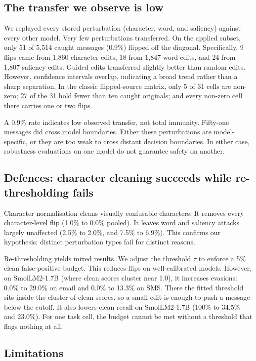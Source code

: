 \subsection{The transfer we observe is low}

We replayed every stored perturbation (character, word, and saliency) against
every other model. Very few perturbations transferred. On the applied subset,
only 51 of 5{,}514 caught messages (0.9\%) flipped off the diagonal.
Specifically, 9 flips came from 1{,}860 character edits, 18 from 1{,}847 word
edits, and 24 from 1{,}807 saliency edits. Guided edits transferred slightly
better than random edits. However, confidence intervals overlap, indicating a
broad trend rather than a sharp separation. In the classic flipped-source
matrix, only 5 of 31 cells are non-zero; 27 of the 31 hold fewer than ten caught
originals; and every non-zero cell there carries one or two flips.

A 0.9\% rate indicates low observed transfer, not total immunity. Fifty-one
messages did cross model boundaries. Either these perturbations are
model-specific, or they are too weak to cross distant decision boundaries. In
either case, robustness evaluations on one model do not guarantee safety on
another.

\subsection{Defences: character cleaning succeeds while re-thresholding fails}

Character normalisation cleans visually confusable characters. It removes every
character-level flip (1.0\% to 0.0\% pooled). It leaves word and saliency
attacks largely unaffected (2.5\% to 2.0\%, and 7.5\% to 6.9\%). This confirms
our hypothesis: distinct perturbation types fail for distinct reasons.

Re-thresholding yields mixed results. We adjust the threshold $\tau$ to enforce a
5\% clean false-positive budget. This reduces flips on well-calibrated models.
However, on SmolLM2-1.7B (where clean scores cluster near 1.0), it increases
evasions: 0.0\% to 29.0\% on email and 0.0\% to 13.3\% on SMS. There the fitted
threshold sits inside the cluster of clean scores, so a small edit is enough to
push a message below the cutoff. It also lowers clean recall on SmolLM2-1.7B
(100\% to 34.5\% and 23.0\%). For one task cell, the budget cannot be met without
a threshold that flags nothing at all.

\subsection{Limitations}

